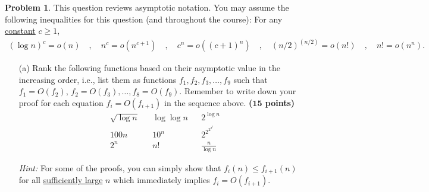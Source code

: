 \documentclass{article}
\theoremstyle{definition}
\newtheorem{problem}{Problem}
\def\fline{\rule{0.75\linewidth}{0.5pt}}
\newcommand{\finishline}{\begin{center}\fline\end{center}}
\newtheorem*{solution*}{Solution}
\newenvironment{solution}{\begin{solution*}}{{\finishline} \end{solution*}}
\newcommand{\grade}[1]{\hfill{\textbf{($\mathbf{#1}$ points)}}}
\begin{document}
\begin{problem}
	This question reviews asymptotic notation. You may assume the following inequalities for this question (and throughout the course): For any \underline{constant} $c \geq 1$, 
	\begin{align*}
		(\log{n})^c = o(n) \quad,\quad n^c = o(n^{c+1}) \quad,\quad c^n = o((c+1)^n) \quad,\quad (n/2)^{(n/2)} = o(n!) \quad,\quad n! = o(n^n). 
	\end{align*}
	\begin{enumerate}
	\item[(a)] Rank the following functions based on their asymptotic value in the increasing order, i.e., list them as functions $f_1,f_2,f_3,\ldots,f_{9}$ such that $f_1 = O(f_2)$, $f_2 = O(f_3), \ldots, f_{8} = O(f_{9})$. Remember to write down your proof
	for each equation $f_i = O(f_{i+1})$ in the sequence above.  \grade{15}
	\begin{align*}
		&\sqrt{\log{n}} &&\log\log{n} &&2^{{\log{n}}}  \\ 
		&100n   &&10^{n} &&2^{2^{2^{2^{2}}}} \\ 
		&2^{n} && n! &&\frac{n}{\log{n}} 
	\end{align*}
	
	\smallskip 
	\emph{Hint:} For some of the proofs, you can simply show that $f_i(n) \leq f_{i+1}(n)$ for all \underline{sufficiently large} $n$ which immediately implies $f_i = O(f_{i+1})$. 
	


\end{enumerate}
\end{problem}
\end{document}
